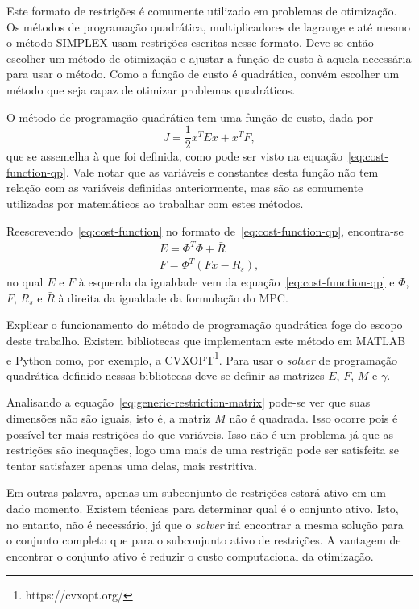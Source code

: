 Este formato de restrições é comumente utilizado em problemas de otimização. Os
métodos de programação quadrática, multiplicadores de lagrange e até mesmo o
método SIMPLEX usam restrições escritas nesse formato. Deve-se então escolher um
método de otimização e ajustar a função de custo à aquela necessária para usar o
método. Como a função de custo é quadrática, convém escolher um método que seja
capaz de otimizar problemas quadráticos.

O método de programação quadrática tem uma função de custo, dada por
%
\begin{equation}
	\label{eq:cost-function-qp}
	J = \frac{1}{2} x^T Ex + x^T F,
\end{equation}
%
que se assemelha à que foi definida, como pode ser visto na
equação~\eqref{eq:cost-function-qp}. Vale notar que as variáveis e constantes
desta função não tem relação com as variáveis definidas anteriormente, mas são
as comumente utilizadas por matemáticos ao trabalhar com estes métodos.

Reescrevendo~\eqref{eq:cost-function} no formato de~\eqref{eq:cost-function-qp},
encontra-se
%
\begin{equation}
	\label{eq:cost-function-qp-constants}
	\begin{split}
		E = \Phi^T \Phi + \bar{R} \\
		F = \Phi^T (Fx - R_s),
	\end{split}
\end{equation}
%
no qual \( E \) e \( F \) à esquerda da igualdade vem da
equação~\eqref{eq:cost-function-qp} e \( \Phi \), \( F \), \( R_s \) e \(\bar{R}
\) à direita da igualdade da formulação do \ac{MPC}.

Explicar o funcionamento do método de programação quadrática foge do escopo
deste trabalho. Existem bibliotecas que implementam este método em MATLAB e
Python como, por exemplo, a CVXOPT\footnote{https://cvxopt.org/}. Para usar o
\textit{solver} de programação quadrática definido nessas bibliotecas deve-se
definir as matrizes \( E \), \( F \), \( M \) e \( \gamma \).

Analisando a equação~\eqref{eq:generic-restriction-matrix} pode-se ver que suas
dimensões não são iguais, isto é, a matriz \( M \) não é quadrada. Isso ocorre
pois é possível ter mais restrições do que variáveis. Isso não é um problema já
que as restrições são inequações, logo uma mais de uma restrição pode ser
satisfeita se tentar satisfazer apenas uma delas, mais restritiva.

Em outras palavra, apenas um subconjunto de restrições estará ativo em um dado
momento. Existem técnicas para determinar qual é o conjunto ativo. Isto, no
entanto, não é necessário, já que o \textit{solver} irá encontrar a mesma
solução para o conjunto completo que para o subconjunto ativo de restrições. A
vantagem de encontrar o conjunto ativo é reduzir o custo computacional da
otimização.

